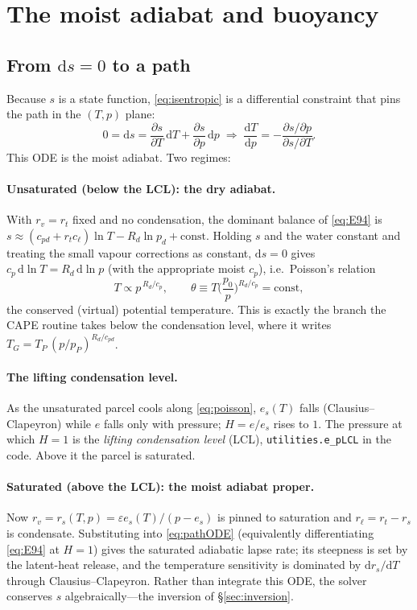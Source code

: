 \documentclass[11pt,a4paper]{article}
\theoremstyle{definition}
\newcommand{\Rd}{R_d}
\newcommand{\cpd}{c_{pd}}
\newcommand{\cl}{c_\ell}
\newcommand{\rt}{r_t}
\newcommand{\rvv}{r_v}
\newcommand{\rl}{r_\ell}
\newcommand{\es}{e_s}
\newcommand{\pd}{p_d}
\newcommand{\eps}{\varepsilon}
\newcommand{\dd}{\mathrm{d}}
\begin{document}
\section{The moist adiabat and buoyancy}\label{sec:adiabat}

\subsection{From $\dd s=0$ to a path}

Because $s$ is a state function, \eqref{eq:isentropic} is a differential
constraint that pins the path in the $(T,p)$ plane:
\begin{equation}\label{eq:pathODE}
0=\dd s=\frac{\partial s}{\partial T}\,\dd T+\frac{\partial s}{\partial p}\,\dd p
\;\Longrightarrow\;
\frac{\dd T}{\dd p}=-\frac{\partial s/\partial p}{\partial s/\partial T}.
\end{equation}
This ODE is the moist adiabat. Two regimes:

\paragraph{Unsaturated (below the LCL): the dry adiabat.} With $\rvv=\rt$ fixed
and no condensation, the dominant balance of \eqref{eq:E94} is
$s\approx(\cpd+\rt\cl)\ln T-\Rd\ln\pd+\mathrm{const}$. Holding $s$ and the water
constant and treating the small vapour corrections as constant, $\dd s=0$ gives
$c_p\,\dd\ln T=\Rd\,\dd\ln p$ (with the appropriate moist $c_p$), i.e.\ Poisson's
relation
\begin{equation}\label{eq:poisson}
T\propto p^{\,\Rd/c_p},\qquad
\theta\equiv T\Big(\frac{p_0}{p}\Big)^{\Rd/c_p}=\mathrm{const},
\end{equation}
the conserved (virtual) potential temperature. This is exactly the branch the
CAPE routine takes below the condensation level, where it writes
$T_G=T_P\,(p/p_P)^{\Rd/\cpd}$.

\paragraph{The lifting condensation level.} As the unsaturated parcel cools
along \eqref{eq:poisson}, $\es(T)$ falls (Clausius--Clapeyron) while $e$ falls
only with pressure; $H=e/\es$ rises to $1$. The pressure at which $H=1$ is the
\emph{lifting condensation level} (LCL), \texttt{utilities.e\_pLCL} in the
code. Above it the parcel is saturated.

\paragraph{Saturated (above the LCL): the moist adiabat proper.} Now
$\rvv=r_s(T,p)=\eps\es(T)/(p-\es)$ is pinned to saturation and
$\rl=\rt-r_s$ is condensate. Substituting into \eqref{eq:pathODE} (equivalently
differentiating \eqref{eq:E94} at $H=1$) gives the saturated adiabatic lapse
rate; its steepness is set by the latent-heat release, and the temperature
sensitivity is dominated by $\dd r_s/\dd T$ through Clausius--Clapeyron. Rather
than integrate this ODE, the solver conserves $s$ algebraically---the inversion
of \S\ref{sec:inversion}.
\end{document}
